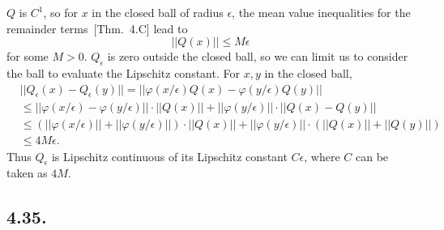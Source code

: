 \documentclass[a4paper,11pt,fleqn]{article}
\begin{document}
$Q$ is $C^1$, so for $x$ in the closed ball of radius $\epsilon$, the mean value inequalities for the remainder terms~[Thm.~4.C]\cite{zeidler2012applied} lead to 
\begin{equation}
    ||Q(x)||\le M\epsilon
\end{equation}
for some $M>0$. $Q_{\epsilon}$ is zero outside the closed ball, so we can limit us to consider the ball to evaluate the Lipschitz constant. For $x,y$ in the closed ball, 
\begin{align}
    &||Q_\epsilon(x)-Q_\epsilon(y)|| = ||\varphi(x/\epsilon)Q(x)-\varphi(y/\epsilon)Q(y)|| \nonumber \\
    &\le ||\varphi(x/\epsilon)-\varphi(y/\epsilon)||\cdot ||Q(x)|| + ||\varphi(y/\epsilon)||\cdot ||Q(x)-Q(y)|| \nonumber \\
    & \le (||\varphi(x/\epsilon)|| + ||\varphi(y/\epsilon)||)\cdot ||Q(x)|| + ||\varphi(y/\epsilon)||\cdot (||Q(x)||+||Q(y)||) \nonumber \\
    &\le 4M\epsilon.
\end{align}
Thus $Q_\epsilon$ is Lipschitz continuous of its Lipschitz constant $C\epsilon$, where $C$ can be taken as $4M$. 
\hruleskip

\subsection{4.35.}

\end{document}
